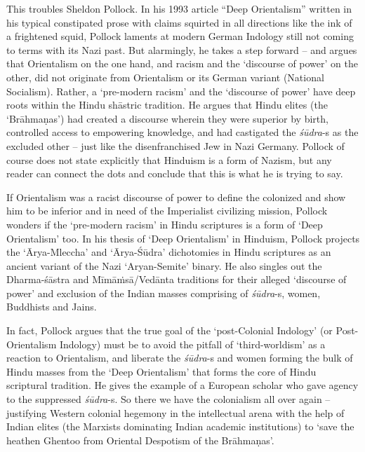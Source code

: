 This troubles Sheldon Pollock. In his 1993 article “Deep Orientalism” written in his typical constipated prose with claims squirted in all directions like the ink of a frightened squid, Pollock laments at modern German Indology still not coming to terms with its Nazi past. But alarmingly, he takes a step forward – and argues that Orientalism on the one hand, and racism and the ‘discourse of power’ on the other, did not originate from Orientalism or its German variant (National Socialism). Rather, a ‘pre-modern racism’ and the ‘discourse of power’ have deep roots within the Hindu shāstric tradition. He argues that Hindu elites (the ‘Brāhmaṇas’) had created a discourse wherein they were superior by birth, controlled access to empowering knowledge, and had castigated the \textit{śūdra}-s as the excluded other – just like the disenfranchised Jew in Nazi Germany. Pollock of course does not state explicitly that Hinduism is a form of Nazism, but any reader can connect the dots and conclude that this is what he is trying to say.

If Orientalism was a racist discourse of power to define the colonized and show him to be inferior and in need of the Imperialist civilizing mission, Pollock wonders if the ‘pre-modern racism’ in Hindu scriptures is a form of ‘Deep Orientalism’ too. In his thesis of ‘Deep Orientalism’ in Hinduism, Pollock projects the ‘Ārya-Mleccha’ and ‘Ārya-Śūdra’ dichotomies in Hindu scriptures as an ancient variant of the Nazi ‘Aryan-Semite’ binary. He also singles out the Dharma-śāstra and Mīmāṁsā/Vedānta traditions for their alleged ‘discourse of power’ and exclusion of the Indian masses comprising of \textit{śūdra}-s, women, Buddhists and Jains.

In fact, Pollock argues that the true goal of the ‘post-Colonial Indology’ (or Post-Orientalism Indology) must be to avoid the pitfall of ‘third-worldism’ as a reaction to Orientalism, and liberate the \textit{śūdra}-s and women forming the bulk of Hindu masses from the ‘Deep Orientalism’ that forms the core of Hindu scriptural tradition. He gives the example of a European scholar who gave agency to the suppressed \textit{śūdra}-s. So there we have the colonialism all over again – justifying Western colonial hegemony in the intellectual arena with the help of Indian elites (the Marxists dominating Indian academic institutions) to ‘save the heathen Ghentoo from Oriental Despotism of the Brāhmaṇas’.

\vspace{-.3cm}

